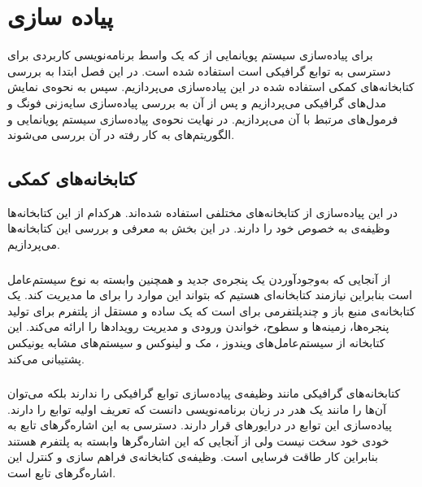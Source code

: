 \chapter { پیاده سازی }



برای پیاده‌سازی سیستم پویانمایی از 
که یک واسط برنامه‌نویسی کاربردی برای دسترسی به توابع گرافیکی است استفاده شده است.
در این فصل ابتدا به بررسی کتابخانه‌های کمکی استفاده شده در این پیاده‌سازی می‌پردازیم. سپس به 
نحوه‌ی نمایش مدل‌های گرافیکی می‌پردازیم و پس از آن به بررسی پیاده‌سازی 
سایه‌زنی فونگ و فرمول‌های مرتبط با آن می‌پردازیم. در نهایت نحوه‌ی پیاده‌سازی سیستم پویانمایی و 
الگوریتم‌های به کار رفته در آن بررسی می‌‌شوند.

\section {کتابخانه‌‌های کمکی}

در این پیاده‌سازی از کتابخانه‌‌های مختلفی استفاده شده‌اند. هرکدام از این کتابخانه‌ها وظیفه‌ی 
به خصوص خود را دارند. در این بخش به معرفی و بررسی این کتابخانه‌ها می‌پردازیم.


\subsection{}

از آنجایی که به‌وجود‌آوردن یک پنجره‌ی جدید و همچنین 
وابسته به نوع سیستم‌عامل است بنابراین نیازمند کتابخانه‌ای هستیم که بتواند این موارد را برای ما مدیریت کند.
یک کتابخانه‌ی منبع باز و چندپلتفرمی برای 
است که یک
ساده و مستقل از پلتفرم برای تولید پنجره‌ها، زمینه‌‌ها
و سطوح، خواندن ورودی و مدیریت رویداد‌ها
را ارائه می‌کند. 
این کتابخانه از سیستم‌عامل‌های 
ویندوز
، 
مک
و 
لینوکس
و سیستم‌های مشابه یونیکس پشتیبانی ‌می‌کند.
\cite{GLFW}


\subsection{}
کتابخانه‌های گرافیکی مانند
وظیفه‌‌ی پیاده‌سازی توابع گرافیکی را ندارند بلکه می‌توان آن‌ها را مانند یک هدر در زبان 
برنامه‌نویسی 
دانست که تعریف اولیه توابع را دارند. پیاده‌سازی این توابع در درایور‌های 
قرار دارند.
دسترسی به این اشاره‌گر‌‌های تابع به خودی خود سخت نیست ولی از آنجایی که این اشاره‌گرها وابسته به پلتفرم هستند بنابراین کار طاقت فرسایی است. 
وظیفه‌ی کتابخانه‌ی 
فراهم سازی و کنترل این اشاره‌گرهای تابع است.
\cite{GLAD}


